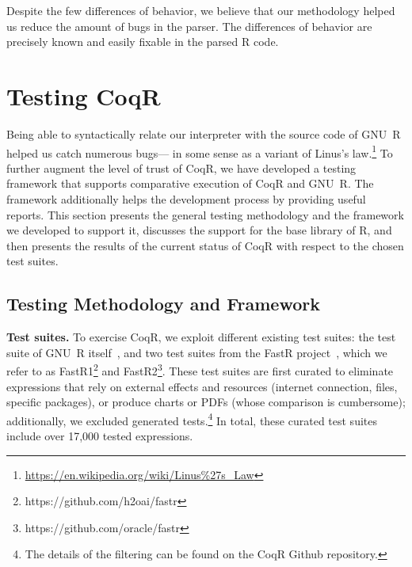 \documentclass[
    sigplan,
    10pt,
    review, %
    natbib=false %
 ]{acmart}
\newcommand\mb[1]{\todo[color=purple!20,size=\scriptsize]{#1}}
\newcommand\et[1]{\todo[color=blue!20,size=\scriptsize]{#1}}
\newcommand\CoqR{CoqR}
\newcommand\newtext[1]{{\color{blue} #1}}
\begin{document}
Despite the few differences of behavior,
we believe that our methodology helped us
reduce the amount of bugs in the parser.
The differences of behavior are precisely known
and easily fixable in the parsed R code.
%
%


\section{Testing \CoqR}
\label{sec:testing:architecture}


Being able to syntactically relate our interpreter
with the source code of GNU~R helped us catch numerous bugs---%
in some sense as a variant of Linus's law.\footnote{\url{https://en.wikipedia.org/wiki/Linus\%27s\_Law}}
To further augment the level of trust of \CoqR{}, we have developed
a testing framework that supports comparative execution of \CoqR{} and GNU~R. The framework additionally helps the development process by providing useful reports. This section presents the general testing methodology and the framework we developed to support it, discusses the support for the base library of R, and then presents the results of the current status of \CoqR{} with respect to the chosen test suites.





\subsection{Testing Methodology and Framework}
\label{sec:test:methodology}

\noindent\textbf{Test suites.}
To exercise \CoqR, we exploit different existing test suites:
the test suite of GNU~R itself~\parencite{Rwebsite}, and two test suites from the FastR project~\parencite{kalibera2014fast}, which we refer to as FastR1\footnote{https://github.com/h2oai/fastr} and FastR2\footnote{https://github.com/oracle/fastr}. \newtext{These test suites are first curated to eliminate expressions that rely on external effects and resources (internet connection, files, specific packages), or produce charts or PDFs (whose comparison is cumbersome); additionally, we excluded generated tests.\footnote{The details of the filtering can be found on the \CoqR{} Github repository.}}
 In total, these curated test suites include over 17,000 tested expressions.
\end{document}
